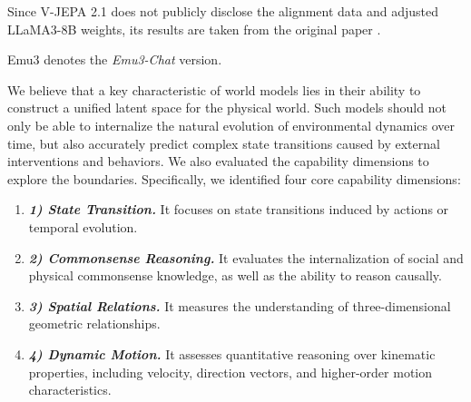 \documentclass{llmxive}
\begin{document}
\begin{table}[!htbp]
\begin{threeparttable}
    \begin{tablenotes}
    \footnotesize
    \item[1] Since V-JEPA 2.1 does not publicly disclose the alignment data and adjusted LLaMA3-8B weights, its results are taken from the original paper \citep{V-JEPA-2.1}.
    \item[2] Emu3 denotes the \textit{Emu3-Chat} version.
    \end{tablenotes}
  \end{threeparttable}
\caption{\textbf{The comparison of the text generation.} $\uparrow$ represents the higher value, the better.}
\label{tab:comparison_tol}
\end{table}





We believe that a key characteristic of world models lies in their ability to construct a unified latent space for the physical world. Such models should not only be able to internalize the natural evolution of environmental dynamics over time, but also accurately predict complex state transitions caused by external interventions and behaviors. 
We also evaluated the capability dimensions to explore the boundaries. Specifically, we identified four core capability dimensions: 



\vspace{-1ex}
\begin{enumerate}[
    leftmargin=1.35em,
    itemsep=0.35em,
    topsep=0.35em,
    parsep=0em
]
    \item[] \textbf{\textit{1) State Transition.}} 
    It focuses on state transitions induced by actions or temporal evolution. 
    
    \item[] \textbf{\textit{2) Commonsense Reasoning.}}
    It evaluates the internalization of social and physical commonsense knowledge, as well as the ability to reason causally. 
    
    \item[] \textbf{\textit{3) Spatial Relations.}}
    It measures the understanding of three-dimensional geometric relationships. 

    \item[] \textbf{\textit{4) Dynamic Motion.}}
    It assesses quantitative reasoning over kinematic properties, including velocity, direction vectors, and higher-order motion characteristics. 
\end{enumerate}
\end{document}
